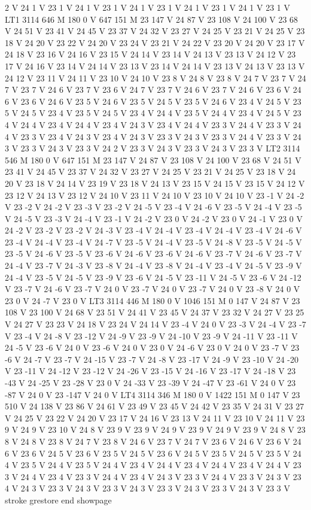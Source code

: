 2 V 24 1 V 23 1 V 24 1 V 23 1 V 24 1 V 23 1 V 24 1 V 23 1 V 24 1 V
23 1 V LT1 3114 646 M 180 0 V 647 151 M 23 147 V 24 87 V 23 108 V 24
100 V 23 68 V 24 51 V 23 41 V 24 45 V 23 37 V 24 32 V 23 27 V 24 25
V 23 21 V 24 25 V 23 18 V 24 20 V 23 22 V 24 20 V 23 24 V 23 21 V 24
22 V 23 20 V 24 20 V 23 17 V 24 18 V 23 16 V 24 16 V 23 15 V 24 14
V 23 14 V 24 13 V 23 13 V 24 12 V 23 17 V 24 16 V 23 14 V 24 14 V 23
13 V 23 14 V 24 14 V 23 13 V 24 13 V 23 13 V 24 12 V 23 11 V 24 11
V 23 10 V 24 10 V 23 8 V 24 8 V 23 8 V 24 7 V 23 7 V 24 7 V 23 7 V
24 6 V 23 7 V 23 6 V 24 7 V 23 7 V 24 6 V 23 7 V 24 6 V 23 6 V 24 6
V 23 6 V 24 6 V 23 5 V 24 6 V 23 5 V 24 5 V 23 5 V 24 6 V 23 4 V 24
5 V 23 5 V 24 5 V 23 4 V 23 5 V 24 5 V 23 4 V 24 4 V 23 5 V 24 4 V
23 4 V 24 5 V 23 4 V 24 4 V 23 4 V 24 4 V 23 4 V 24 3 V 23 4 V 24 4
V 23 3 V 24 4 V 23 3 V 24 4 V 23 3 V 23 4 V 24 3 V 23 4 V 24 3 V 23
3 V 24 3 V 23 3 V 24 4 V 23 3 V 24 3 V 23 3 V 24 3 V 23 3 V 24 2 V
23 3 V 24 3 V 23 3 V 24 3 V 23 3 V LT2 3114 546 M 180 0 V 647 151 M
23 147 V 24 87 V 23 108 V 24 100 V 23 68 V 24 51 V 23 41 V 24 45 V
23 37 V 24 32 V 23 27 V 24 25 V 23 21 V 24 25 V 23 18 V 24 20 V 23
18 V 24 14 V 23 19 V 23 18 V 24 13 V 23 15 V 24 15 V 23 15 V 24 12
V 23 12 V 24 13 V 23 12 V 24 10 V 23 11 V 24 10 V 23 10 V 24 10 V 23
-1 V 24 -2 V 23 -2 V 24 -2 V 23 -3 V 23 -2 V 24 -5 V 23 -4 V 24 -6
V 23 -5 V 24 -4 V 23 -5 V 24 -5 V 23 -3 V 24 -4 V 23 -1 V 24 -2 V 23
0 V 24 -2 V 23 0 V 24 -1 V 23 0 V 24 -2 V 23 -2 V 23 -2 V 24 -3 V 23
-4 V 24 -4 V 23 -4 V 24 -4 V 23 -4 V 24 -6 V 23 -4 V 24 -4 V 23 -4
V 24 -7 V 23 -5 V 24 -4 V 23 -5 V 24 -8 V 23 -5 V 24 -5 V 23 -5 V 24
-6 V 23 -5 V 23 -6 V 24 -6 V 23 -6 V 24 -6 V 23 -7 V 24 -6 V 23 -7
V 24 -4 V 23 -7 V 24 -3 V 23 -8 V 24 -4 V 23 -8 V 24 -4 V 23 -4 V 24
-5 V 23 -9 V 24 -4 V 23 -5 V 24 -5 V 23 -9 V 23 -6 V 24 -5 V 23 -11
V 24 -5 V 23 -6 V 24 -12 V 23 -7 V 24 -6 V 23 -7 V 24 0 V 23 -7 V 24
0 V 23 -7 V 24 0 V 23 -8 V 24 0 V 23 0 V 24 -7 V 23 0 V LT3 3114 446
M 180 0 V 1046 151 M 0 147 V 24 87 V 23 108 V 23 100 V 24 68 V 23 51
V 24 41 V 23 45 V 24 37 V 23 32 V 24 27 V 23 25 V 24 27 V 23 23 V 24
18 V 23 24 V 24 14 V 23 -4 V 24 0 V 23 -3 V 24 -4 V 23 -7 V 23 -4 V
24 -8 V 23 -12 V 24 -9 V 23 -9 V 24 -10 V 23 -9 V 24 -11 V 23 -11 V
24 -5 V 23 -6 V 24 0 V 23 -6 V 24 0 V 23 0 V 24 -6 V 23 0 V 24 0 V
23 -7 V 23 -6 V 24 -7 V 23 -7 V 24 -15 V 23 -7 V 24 -8 V 23 -17 V 24
-9 V 23 -10 V 24 -20 V 23 -11 V 24 -12 V 23 -12 V 24 -26 V 23 -15 V
24 -16 V 23 -17 V 24 -18 V 23 -43 V 24 -25 V 23 -28 V 23 0 V 24 -33
V 23 -39 V 24 -47 V 23 -61 V 24 0 V 23 -87 V 24 0 V 23 -147 V 24 0
V LT4 3114 346 M 180 0 V 1422 151 M 0 147 V 23 510 V 24 138 V 23 86
V 24 61 V 23 49 V 23 45 V 24 42 V 23 35 V 24 31 V 23 27 V 24 25 V 23
22 V 24 20 V 23 17 V 24 16 V 23 13 V 24 11 V 23 10 V 24 11 V 23 9 V
24 9 V 23 10 V 24 8 V 23 9 V 23 9 V 24 9 V 23 9 V 24 9 V 23 9 V 24
8 V 23 8 V 24 8 V 23 8 V 24 7 V 23 8 V 24 6 V 23 7 V 24 7 V 23 6 V
24 6 V 23 6 V 24 6 V 23 6 V 24 5 V 23 6 V 23 5 V 24 5 V 23 6 V 24 5
V 23 5 V 24 5 V 23 5 V 24 4 V 23 5 V 24 4 V 23 5 V 24 4 V 23 4 V 24
4 V 23 4 V 24 4 V 23 4 V 24 4 V 23 3 V 24 4 V 23 4 V 23 3 V 24 4 V
23 4 V 24 3 V 23 3 V 24 4 V 23 3 V 24 3 V 23 4 V 24 3 V 23 3 V 24 3
V 23 3 V 24 3 V 23 3 V 24 3 V 23 3 V 24 3 V 23 3 V stroke grestore
end showpage
 

